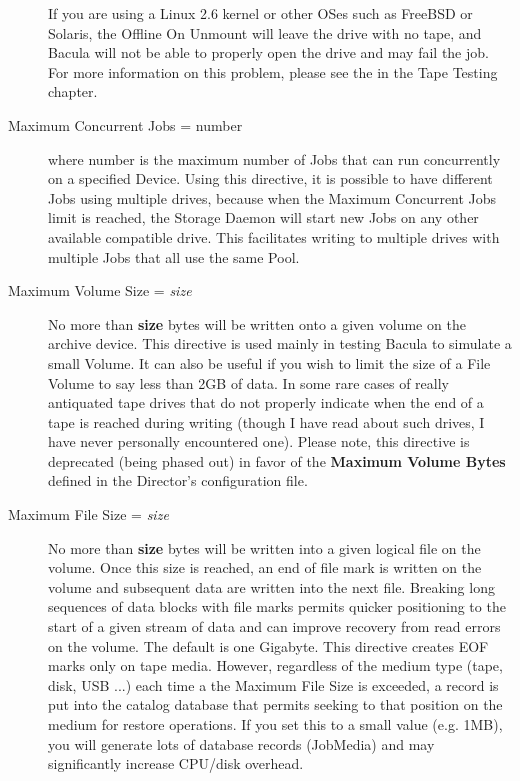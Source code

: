 \begin{description}
   If you are using a Linux 2.6 kernel or other OSes
   such as FreeBSD or Solaris, the Offline On Unmount will leave the drive
   with no tape, and Bacula will not be able to properly open the drive and
   may fail the job.  For more information on this problem, please see the
    in the Tape
   Testing chapter.

\item [Maximum Concurrent Jobs = \lt{}number\gt{}]
   where \lt{}number\gt{} is the maximum number of Jobs that can run
   concurrently on a specified Device.  Using this directive, it is possible
   to have different Jobs using multiple drives, because when 
   the Maximum Concurrent Jobs limit is
   reached, the Storage Daemon will start new Jobs on any other available
   compatible drive.  This facilitates writing to multiple drives with
   multiple Jobs that all use the same Pool.

\item [Maximum Volume Size = {\it size}]
   No more than {\bf size} bytes will be written onto a given volume on the
   archive device.  This directive is used mainly in testing Bacula to
   simulate a small Volume.  It can also be useful if you wish to limit the
   size of a File Volume to say less than 2GB of data.  In some rare cases
   of really antiquated tape drives that do not properly indicate when the
   end of a tape is reached during writing (though I have read about such
   drives, I have never personally encountered one).  Please note, this
   directive is deprecated (being phased out) in favor of the {\bf Maximum
   Volume Bytes} defined in the Director's configuration file.

\item [Maximum File Size = {\it size}]
   No more than {\bf size} bytes will be written into a given logical file
   on the volume.  Once this size is reached, an end of file mark is
   written on the volume and subsequent data are written into the next
   file.  Breaking long sequences of data blocks with file marks permits
   quicker positioning to the start of a given stream of data and can
   improve recovery from read errors on the volume.  The default is one
   Gigabyte.  This directive creates EOF marks only on tape media.
   However, regardless of the medium type (tape, disk, USB ...) each time
   a the Maximum File Size is exceeded, a record is put into the catalog
   database that permits seeking to that position on the medium for
   restore operations. If you set this to a small value (e.g. 1MB),
   you will generate lots of database records (JobMedia) and may
   significantly increase CPU/disk overhead.


\end{description}
